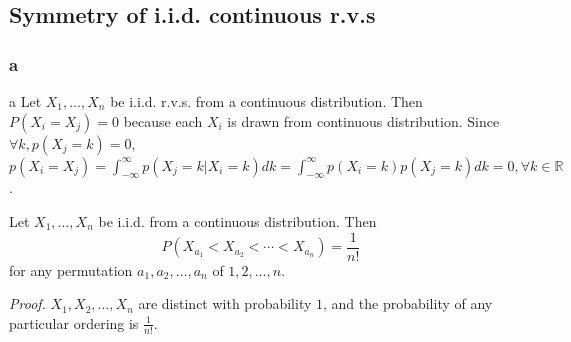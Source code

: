 \documentclass[8pt]{beamer}
\newcommand{\mbb}[1]{\mathbb{#1}}
\newcommand{\ti}[1]{\textit{#1}}
\begin{document}
\subsection{Symmetry of i.i.d. continuous r.v.s}

\begin{frame}
    \frametitle{a}
    \tableofcontents[currentsubsection]
\end{frame}

\begin{frame}{a}
    Let $X_1, \dots, X_n$ be i.i.d. r.v.s. from a continuous distribution. Then $P(X_i = X_j) = 0$ because each $X_i$ is drawn from continuous distribution. Since $\forall k, p(X_j=k) = 0$, $p(X_i = X_j) = \int_{-\infty}^{\infty} p(X_j=k | X_i=k) dk = \int_{-\infty}^\infty p(X_i=k) p(X_j=k) dk = 0, \forall k \in \mbb{R}$.

    \begin{theorem}
        Let $X_1, \dots, X_n$ be i.i.d. from a continuous distribution. Then 
        \[
        P(X_{a_1} < X_{a_2} < \cdots < X_{a_n}) = \frac{1}{n!}
        \]
        for any permutation $a_1,a_2,\dots, a_n$ of $1, 2, \dots, n$.
    \end{theorem}

    \ti{Proof.} $X_1, X_2, \dots, X_n$ are distinct with probability $1$, and the probability of any particular ordering is $\frac{1}{n!}$.
\end{frame}
\end{document}
